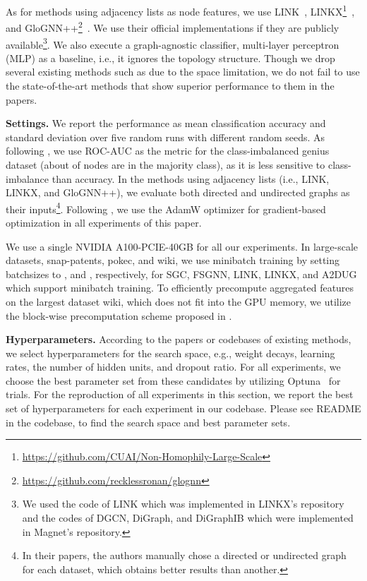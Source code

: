 As for methods using adjacency lists as node features, we use LINK~\cite{zheleva2009join}, LINKX\footnote{\url{https://github.com/CUAI/Non-Homophily-Large-Scale}}~\cite{lim2021large}, and GloGNN++\footnote{\url{https://github.com/recklessronan/glognn}}~\cite{li2022finding}. 
We use their official implementations if they are publicly available\footnote{We used the code of LINK which was implemented in LINKX's repository and the codes of DGCN, DiGraph, and DiGraphIB which were implemented in Magnet's repository.}.
We also execute a graph-agnostic classifier, multi-layer perceptron (MLP) as a baseline, i.e., it ignores the topology structure. 
Though we drop several existing methods such as \cite{velickovic2018graph, xu2018powerful, hamilton2017inductive, sign_icml_grl2020, zhu2020beyond} due to the space limitation, we do not fail to use the state-of-the-art methods that show superior performance to them in the papers. 

\smallskip \noindent \textbf{Settings.} 
We report the performance as mean classification accuracy and standard deviation over five random runs with different random seeds. 
As following \cite{lim2021large}, we use ROC-AUC as the metric for the class-imbalanced genius dataset (about  of nodes are in the majority class), as it is less sensitive to class-imbalance than accuracy. 
In the methods using adjacency lists (i.e., LINK, LINKX, and GloGNN++), we evaluate both directed and undirected graphs as their inputs\footnote{In their papers, the authors manually chose a directed or undirected graph for each dataset, which obtains better results than another. }.
Following \cite{lim2021large}, we use the AdamW optimizer for gradient-based optimization in all experiments of this paper. 

We use a single NVIDIA A100-PCIE-40GB for all our experiments.
In large-scale datasets, snap-patents, pokec, and wiki, we use minibatch training by setting batchsizes to , and , respectively, for SGC, FSGNN, LINK, LINKX, and A2DUG which support minibatch training. 
To efficiently precompute aggregated features on the largest dataset wiki, which does not fit into the GPU memory, we utilize the block-wise
precomputation scheme proposed in \cite{maekawa2022gnn}.

\smallskip\noindent\textbf{Hyperparameters. } 
According to the papers or codebases of existing methods, we select hyperparameters for the search space, e.g., weight decays, learning rates, the number of hidden units, and dropout ratio. 
For all experiments, we choose the best parameter set from these candidates by utilizing Optuna~\cite{akiba2019optuna} for  trials. 
For the reproduction of all experiments in this section,
we report the best set of hyperparameters for each experiment in our codebase. 
Please see README in the codebase, to find the search space and best parameter sets. 



